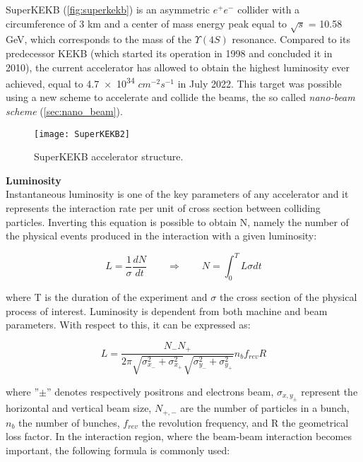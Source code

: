 SuperKEKB (\autoref{fig:superkekb}) is an asymmetric $e^{+}e^{-}$ collider with a circumference of 3 km and a center of mass energy peak equal to  $\sqrt{s}$ = 10.58 GeV, which corresponds to the mass of the $\Upsilon(4S)$ resonance.
Compared to its predecessor KEKB (which started its operation in 1998 and concluded it in 2010), the current accelerator has allowed to obtain the highest luminosity ever achieved, equal to \num{4.7e34} $cm^{-2}s^{-1}$ in July 2022. This target was possible using a new scheme to accelerate and collide the beams, the so called \textit{nano-beam scheme} (\autoref{sec:nano_beam}). 


\begin{figure}[h!]
\centering
\texttt{[image: SuperKEKB2]}
\caption{SuperKEKB accelerator structure.}
\label{fig:superkekb}
\end{figure}


\bigskip

\textbf{Luminosity}\\

Instantaneous luminosity is one of the key parameters of any accelerator and it represents the interaction rate per unit of cross section between colliding particles. Inverting this equation is possible to obtain N, namely the number of the physical events produced in the interaction with a given luminosity:

\begin{equation}
L =\frac{1}{\sigma}\frac{dN}{dt}  \qquad   \Rightarrow \qquad  N = \int_{0}^{T} L\sigma dt
\end{equation}

where T is the duration of the experiment and $\sigma$ the cross section of the physical process of interest. Luminosity is dependent from both machine and beam parameters. With respect to this, it can be expressed as:

\begin{equation}
L = \frac{N_{-} N_{+}}{2\pi\sqrt{\sigma_{x_{-}}^{2} + \sigma_{x_{+}}^{2}} \sqrt{\sigma_{y_{-}}^{2} + \sigma_{y_{+}}^{2}}} n_{b}f_{rev}R
\end{equation}

where ''$\pm$'' denotes respectively positrons and electrons beam, $\sigma_{x,y_{\pm}}$ represent the horizontal and vertical beam size, $N_{+,-}$  are the number of particles in a bunch, $n_{b}$ the number of bunches, $f_{rev}$ the revolution frequency, and R the geometrical loss factor. In the interaction region, where the beam-beam interaction becomes important, the following formula is commonly used:

